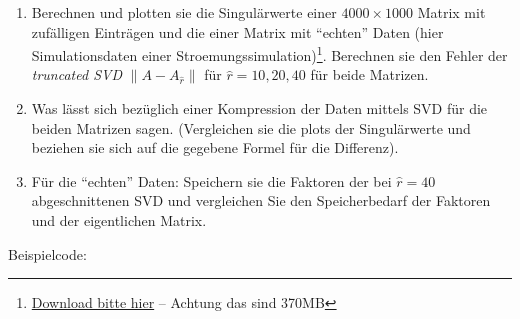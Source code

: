 \documentclass[
]{book}
\providecommand{\tightlist}{%
  \setlength{\itemsep}{0pt}\setlength{\parskip}{0pt}}
\theoremstyle{definition}
\theoremstyle{definition}
\theoremstyle{definition}
\theoremstyle{definition}
\theoremstyle{remark}
\begin{document}
\begin{enumerate}
\def\labelenumi{\arabic{enumi}.}
\tightlist
\item
  Berechnen und plotten sie die Singulärwerte einer \(4000\times 1000\) Matrix mit zufälligen Einträgen und die einer Matrix mit ``echten'' Daten (hier Simulationsdaten einer Stroemungssimulation)\footnote{ \href{https://owncloud.gwdg.de/index.php/s/sAjEy9B8kIbzoYj}{Download bitte hier} -- Achtung das sind 370MB}. Berechnen sie den Fehler der \emph{truncated SVD} \(\|A-A_{\hat r}\|\) für \(\hat r = 10, 20, 40\) für beide Matrizen.
\item
  Was lässt sich bezüglich einer Kompression der Daten mittels SVD für die beiden Matrizen sagen. (Vergleichen sie die plots der Singulärwerte und beziehen sie sich auf die gegebene Formel für die Differenz).
\item
  Für die ``echten'' Daten: Speichern sie die Faktoren der bei \(\hat r=40\) abgeschnittenen SVD und vergleichen Sie den Speicherbedarf der Faktoren und der eigentlichen Matrix.
\end{enumerate}

Beispielcode:
\end{document}
